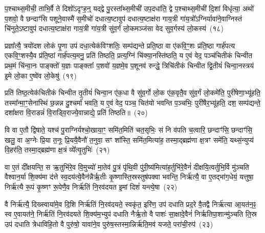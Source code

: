 प॒श्चाथ्स॒मीची॒ ताभि॒र्वै ते दिशो॑\-ऽदृꣳह॒न्॒ यद्द्वे पु॒रस्ता᳚थ्स॒मीची॑ उप॒दधा॑ति॒ द्वे प॒श्चाथ्स॒मीची॑ दि॒शां विधृ॑त्या॒ अथो॑ प॒शवो॒ वै छन्दाꣳ॑सि पशूने॒वास्मै॑ स॒मीचो॑ दधात्य॒ष्टावुप॑ दधात्य॒ष्टाक्ष॑रा गाय॒त्री गा॑य॒त्रो᳚\-ऽग्निर्यावा॑ने॒वाग्निस्तं चि॑नुते॒\-ऽष्टावुप॑ दधात्य॒ष्टाक्ष॑रा गाय॒त्री गा॑य॒त्री सु॑व॒र्गं लो॒कमञ्ज॑सा वेद सुव॒र्गस्य॑ लो॒कस्य॑~(१८)

प्रज्ञा᳚त्यै॒ त्रयो॑दश लोकं पृ॒णा उप॑ दधा॒त्येक॑विꣳशतिः॒ सम्प॑द्यन्ते प्रति॒ष्ठा वा ए॑कवि॒ꣳ॒शः प्र॑ति॒ष्ठा गार्\mbox{}ह॑पत्य एकवि॒ꣳ॒शस्यै॒व प्र॑ति॒ष्ठां गार्\mbox{}ह॑पत्य॒मनु॒ प्रति॑ तिष्ठति॒ प्रत्य॒ग्निं चि॑क्या॒नस्ति॑ष्ठति॒ य ए॒वं वेद॒ पञ्च॑चितीकं चिन्वीत प्रथ॒मं चि॑न्वा॒नः पाङ्क्तो॑ य॒ज्ञः पाङ्क्ताः᳚ प॒शवो॑ य॒ज्ञमे॒व प॒शूनव॑ रुन्द्धे॒ त्रिचि॑तीकं चिन्वीत द्वि॒तीयं॑ चिन्वा॒नस्त्रय॑ इ॒मे लो॒का ए॒ष्वे॑व लो॒केषु॑~(१९)

प्रति॑ तिष्ठ॒त्येक॑चितीकं चिन्वीत तृ॒तीयं॑ चिन्वा॒न ए॑क॒धा वै सु॑व॒र्गो लो॒क ए॑क॒वृतै॒व सु॑व॒र्गं लो॒कमे॑ति॒ पुरी॑षेणा॒भ्यू॑हति॒ तस्मा᳚न्मा॒ꣳ॒सेनास्थि॑ छ॒न्नन्न दु॒श्चर्मा॑ भवति॒ य ए॒वं वेद॒ पञ्च॒ चित॑यो भवन्ति प॒ञ्चभिः॒ पुरी॑षैर॒भ्यू॑हति॒ दश॒ सम्प॑द्यन्ते॒ दशा᳚क्षरा वि॒राडन्नं॑ वि॒राड्वि॒राज्ये॒वान्नाद्ये॒ प्रति॑ तिष्ठति॥~(२०)

{}%

वि वा ए॒तौ द्वि॑षाते॒ यश्च॑ पु॒राग्निर्यश्चो॒खाया॒ꣳ॒ समि॑त॒मिति॑ चत॒सृभिः॒ सं नि व॑पति च॒त्वारि॒ छन्दाꣳ॑सि॒ छन्दाꣳ॑सि॒ खलु॒ वा अ॒ग्नेः प्रि॒या त॒नूः प्रि॒ययै॒वैनौ॑ त॒नुवा॒ सꣳ शा᳚स्ति॒ समि॑त॒मित्या॑ह॒ तस्मा॒द्ब्रह्म॑णा क्ष॒त्रꣳ समे॑ति॒ यथ्सं॒न्युप्य॑ वि॒हर॑ति॒ तस्मा॒द्ब्रह्म॑णा क्ष॒त्रं व्ये᳚त्यृ॒तुभिः॑~(२१)

वा ए॒तं दी᳚क्षयन्ति॒ स ऋ॒तुभि॑रे॒व वि॒मुच्यो॑ मा॒तेव॑ पु॒त्रं पृ॑थि॒वी पु॑री॒ष्य॑मित्या॑ह॒र्तुभि॑रे॒वैनं॑ दीक्षयि॒त्वर्तुभि॒र्वि मु॑ञ्चति वैश्वान॒र्या शि॒क्य॑मा द॑त्ते स्व॒दय॑त्ये॒वैन॑न्नैर्\mbox{}ऋ॒तीः कृ॒ष्णास्ति॒स्रस्तुष॑पक्वा भवन्ति॒ निर्\mbox{}ऋ॑त्यै॒ वा ए॒तद्भा॑ग॒धेयं॒ यत्तुषा॒ निर्\mbox{}ऋ॑त्यै रू॒पं कृ॒ष्णꣳ रू॒पेणै॒व निर्\mbox{}ऋ॑तिं नि॒रव॑दयत इ॒मां दिशं॑ यन्त्ये॒षा~(२२)

वै निर्\mbox{}ऋ॑त्यै॒ दिख्स्वाया॑मे॒व दि॒शि निर्\mbox{}ऋ॑तिं नि॒रव॑दयते॒ स्वकृ॑त॒ इरि॑ण॒ उप॑ दधाति प्रद॒रे वै॒तद्वै निर्\mbox{}ऋ॑त्या आ॒यत॑न॒ꣴ॒ स्व ए॒वायत॑ने॒ निर्\mbox{}ऋ॑तिं नि॒रव॑दयते शि॒क्य॑म॒भ्युप॑ दधाति नैर्\mbox{}ऋ॒तो वै पाशः॑ सा॒क्षादे॒वैनं॑ निर्\mbox{}ऋतिपा॒शान्मु॑ञ्चति ति॒स्र उप॑ दधाति त्रेधाविहि॒तो वै पुरु॑षो॒ यावा॑ने॒व पुरु॑ष॒स्तस्मा॒न्निर्\mbox{}ऋ॑ति॒मव॑ यजते॒ परा॑ची॒रुप॑~(२३)

